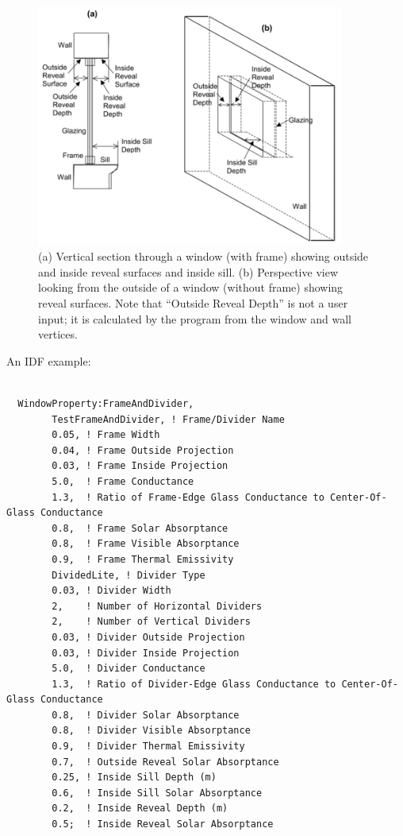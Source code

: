 \begin{figure}[hbtp] %
\centering
\includegraphics[width=0.9\textwidth, height=0.9\textheight, keepaspectratio=true]{media/image064.png}
\caption{(a) Vertical section through a window (with frame) showing outside and inside reveal surfaces and inside sill. (b) Perspective view looking from the outside of a window (without frame) showing reveal surfaces. Note that “Outside Reveal Depth” is not a user input; it is calculated by the program from the window and wall vertices. \protect \label{fig:a-vertical-section-through-a-window-with}}
\end{figure}

An IDF example:

\begin{lstlisting}

  WindowProperty:FrameAndDivider,
        TestFrameAndDivider, ! Frame/Divider Name
        0.05, ! Frame Width
        0.04, ! Frame Outside Projection
        0.03, ! Frame Inside Projection
        5.0,  ! Frame Conductance
        1.3,  ! Ratio of Frame-Edge Glass Conductance to Center-Of-Glass Conductance
        0.8,  ! Frame Solar Absorptance
        0.8,  ! Frame Visible Absorptance
        0.9,  ! Frame Thermal Emissivity
        DividedLite, ! Divider Type
        0.03, ! Divider Width
        2,    ! Number of Horizontal Dividers
        2,    ! Number of Vertical Dividers
        0.03, ! Divider Outside Projection
        0.03, ! Divider Inside Projection
        5.0,  ! Divider Conductance
        1.3,  ! Ratio of Divider-Edge Glass Conductance to Center-Of-Glass Conductance
        0.8,  ! Divider Solar Absorptance
        0.8,  ! Divider Visible Absorptance
        0.9,  ! Divider Thermal Emissivity
        0.7,  ! Outside Reveal Solar Absorptance
        0.25, ! Inside Sill Depth (m)
        0.6,  ! Inside Sill Solar Absorptance
        0.2,  ! Inside Reveal Depth (m)
        0.5;  ! Inside Reveal Solar Absorptance
\end{lstlisting}

